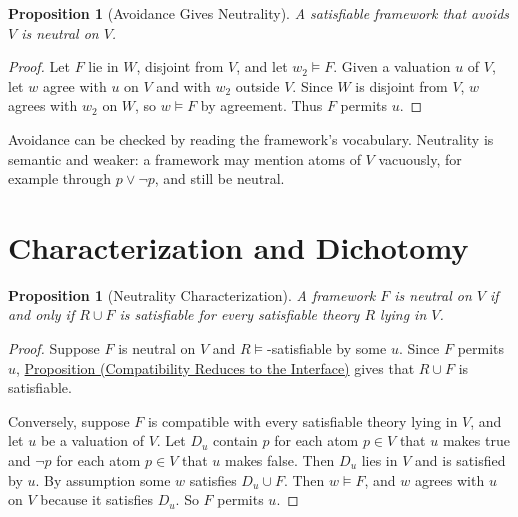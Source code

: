 \documentclass[11pt]{article}
\theoremstyle{plain}
\newtheorem{proposition}[theorem]{Proposition}
\theoremstyle{definition}
\theoremstyle{remark}
\newcommand{\PropRef}[2]{\hyperref[#1]{Proposition (#2)}}
\newcommand{\Framework}{F}
\begin{document}
\begin{proposition}[Avoidance Gives Neutrality]
  \label{se110.proposition.NeutralOnOfAvoids}
  A satisfiable framework that avoids $V$ is neutral on $V$.
\end{proposition}

\begin{proof}
  Let $\Framework$ lie in $W$, disjoint from $V$, and let $w_2 \models
  \Framework$.
  Given a valuation $u$ of $V$, let $w$ agree with $u$ on $V$ and with $w_2$
  outside $V$.
  Since $W$ is disjoint from $V$, $w$ agrees with $w_2$ on $W$, so
  $w \models \Framework$ by agreement.
  Thus $\Framework$ permits $u$.
\end{proof}

Avoidance can be checked by reading the framework's vocabulary.
Neutrality is semantic and weaker: a framework may mention atoms of $V$
vacuously, for example through $p \vee \neg p$, and still be neutral.

\section{Characterization and Dichotomy}
\label{sec:characterization}

\begin{proposition}[Neutrality Characterization]
  \label{se110.proposition.NeutralOnIffCompatible}
  A framework $\Framework$ is neutral on $V$ if and only if $R \cup \Framework$
  is satisfiable for every satisfiable theory $R$ lying in $V$.
\end{proposition}

\begin{proof}
  Suppose $\Framework$ is neutral on $V$ and $R \models$-satisfiable by some
  $u$.
  Since $\Framework$ permits $u$,
  \PropRef{se110.proposition.SatisfiableUnionIffPermits}{Compatibility Reduces
    to the Interface} gives that $R \cup \Framework$ is satisfiable.

  Conversely, suppose $\Framework$ is compatible with every satisfiable theory
  lying in $V$, and let $u$ be a valuation of $V$.
  Let $D_u$ contain $p$ for each atom $p \in V$ that $u$ makes true and
  $\neg p$ for each atom $p \in V$ that $u$ makes false.
  Then $D_u$ lies in $V$ and is satisfied by $u$.
  By assumption some $w$ satisfies $D_u \cup \Framework$.
  Then $w \models \Framework$, and $w$ agrees with $u$ on $V$ because it
  satisfies $D_u$.
  So $\Framework$ permits $u$.
\end{proof}
\end{document}
